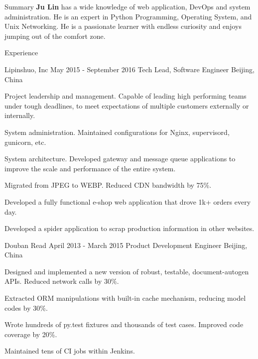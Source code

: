 \documentclass{resume}
\begin{document}
  \begin{rSection}{Summary}
    { {\bf Ju Lin } has a wide knowledge of web application, DevOps and system administration. He is an expert in Python Programming, Operating System, and Unix Networking. He is a passionate learner with endless curiosity and enjoys jumping out of the comfort zone. }
  \end{rSection}

  \begin{rSection}{Experience}

    \begin{rSubsection}{Lipinshuo, Inc}{ May 2015 - September 2016 }{Tech Lead, Software Engineer }{Beijing, China}
    \item Project leadership and management. Capable of leading high performing teams under tough deadlines, to meet expectations of multiple customers externally or internally.
    \item System administration. Maintained configurations for Nginx, supervisord, gunicorn, etc.
    \item System architecture. Developed gateway and message queue applications to improve the scale and performance of the entire system.
    \item Migrated from JPEG to WEBP. Reduced CDN bandwidth by 75\%.
    \item Developed a fully functional e-shop web application that drove 1k+ orders every day.
    \item Developed a spider application to scrap production information in other websites.
    \end{rSubsection}

    \begin{rSubsection}{ Douban Read }{ April 2013 - March 2015 }{ Product Development Engineer }{Beijing, China}
    \item Designed and implemented a new version of robust, testable, document-autogen APIs. Reduced network calls by 30\%.
    \item Extracted ORM manipulations with built-in cache mechanism, reducing model codes by 30\%.
    \item Wrote hundreds of py.test fixtures and thousands of test cases. Improved code coverage by 20\%.
    \item Maintained tens of CI jobs within Jenkins.
    \end{rSubsection}


\end{rSection}
\end{document}
